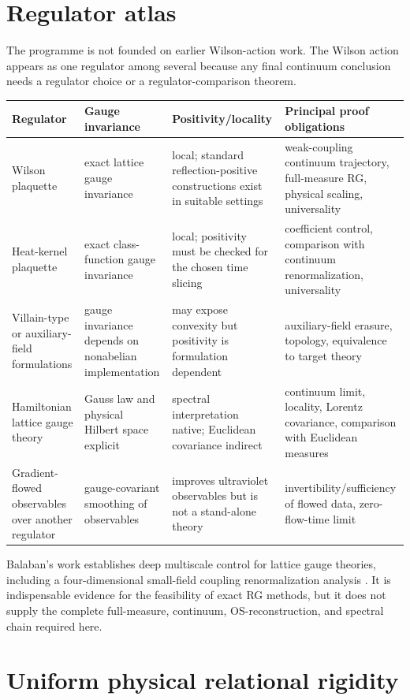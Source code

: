 \documentclass[11pt]{article}
\theoremstyle{remark}
\begin{document}
\section{Regulator atlas}

The programme is not founded on earlier Wilson-action work.  The Wilson action
appears as one regulator among several because any final continuum conclusion
needs a regulator choice or a regulator-comparison theorem.

\begin{longtable}{p{}p{}p{}p{}}
\toprule
Regulator & Gauge invariance & Positivity/locality & Principal proof obligations\\
\midrule
\endhead
Wilson plaquette & exact lattice gauge invariance & local; standard reflection-positive constructions exist in suitable settings & weak-coupling continuum trajectory, full-measure RG, physical scaling, universality\\
Heat-kernel plaquette & exact class-function gauge invariance & local; positivity must be checked for the chosen time slicing & coefficient control, comparison with continuum renormalization, universality\\
Villain-type or auxiliary-field formulations & gauge invariance depends on nonabelian implementation & may expose convexity but positivity is formulation dependent & auxiliary-field erasure, topology, equivalence to target theory\\
Hamiltonian lattice gauge theory & Gauss law and physical Hilbert space explicit & spectral interpretation native; Euclidean covariance indirect & continuum limit, locality, Lorentz covariance, comparison with Euclidean measures\\
Gradient-flowed observables over another regulator & gauge-covariant smoothing of observables & improves ultraviolet observables but is not a stand-alone theory & invertibility/sufficiency of flowed data, zero-flow-time limit\\
\bottomrule
\end{longtable}

Balaban's work establishes deep multiscale control for lattice gauge theories,
including a four-dimensional small-field coupling renormalization analysis
\cite{BalabanI}.  It is indispensable evidence for the feasibility of exact
RG methods, but it does not supply the complete full-measure, continuum,
OS-reconstruction, and spectral chain required here.

\section{Uniform physical relational rigidity}
\end{document}
